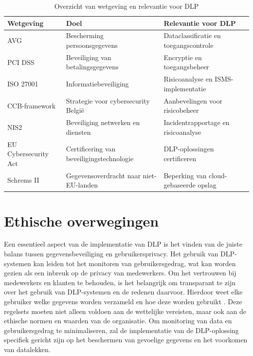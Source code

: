   
  \begin{table}[h]
    \centering
    \small
    \begin{tabular}{p{4cm} p{5cm} p{6cm}}
        \toprule
        \textbf{Wetgeving} & \textbf{Doel} & \textbf{Relevantie voor DLP} \\
        \midrule
        AVG & Bescherming persoonsgegevens & Dataclassificatie en toegangscontrole \\
        PCI DSS & Beveiliging van betalingsgegevens & Encryptie en toegangsbeheer \\
        ISO 27001 & Informatiebeveiliging & Risicoanalyse en ISMS-implementatie \\
        CCB-framework & Strategie voor cybersecurity België & Aanbevelingen voor risicobeheer \\
        NIS2 & Beveiliging netwerken en diensten & Incidentrapportage en risicoanalyse \\
        EU Cybersecurity Act & Certificering van beveiligingstechnologie & DLP-oplossingen certificeren \\
        Schrems II & Gegevensoverdracht naar niet-EU-landen & Beperking van cloud-gebaseerde opslag \\
        \bottomrule
    \end{tabular}
    \caption{Overzicht van wetgeving en relevantie voor DLP}
    \label{tab:wetgeving_dlp}
\end{table}


  

\section{Ethische overwegingen}%

Een essentieel aspect van de implementatie van DLP is het vinden van de juiste balans tussen gegevensbeveiliging en gebruikersprivacy. 
Het gebruik van DLP-systemen kan leiden tot het monitoren van gebruikersgedrag, wat kan worden gezien als een inbreuk op de privacy van medewerkers. 
Om het vertrouwen bij medewerkers en klanten te behouden, is het belangrijk om transparant te zijn over het gebruik van DLP-systemen en de redenen daarvoor. 
Hierdoor weet elke gebruiker welke gegevens worden verzameld en hoe deze worden gebruikt \autocite{Zaini2024}. 
Deze regelsets moeten niet alleen voldoen aan de wettelijke vereisten, maar ook aan de ethische normen en waarden van de organisatie. 
Om monitoring van data en gebruikersgedrag te minimaliseren, 
zal de implementatie van de DLP-oplossing specifiek gericht zijn op het beschermen van gevoelige gegevens en het voorkomen van datalekken. 


